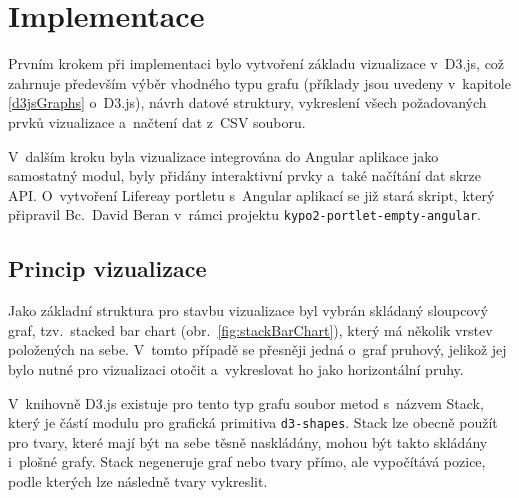 \documentclass[
  digital, %
  oneside, %
  table,   %
  nolof,     %
  nolot,     %
  nocover
]{fithesis3}
\begin{document}
\chapter{Implementace}
Prvním krokem při implementaci bylo vytvoření základu vizualizace v~D3.js, což zahrnuje především výběr vhodného typu grafu (příklady jsou uvedeny v~kapitole \ref{d3jsGraphs} o~D3.js), návrh datové struktury, vykreslení všech požadovaných prvků vizualizace a~načtení dat z~CSV souboru.\par
V~dalším kroku byla vizualizace integrována do Angular aplikace jako samostatný modul, byly přidány interaktivní prvky a~také načítání dat skrze API. O~vytvoření Lifereay portletu s~Angular aplikací se již stará skript, který připravil Bc.~David Beran v~rámci projektu \verb|kypo2-portlet-empty-angular|.
\section{Princip vizualizace}
Jako základní struktura pro stavbu vizualizace byl vybrán skládaný sloupcový graf, tzv.~stacked bar chart (obr.~\ref{fig:stackBarChart}), který má několik vrstev položených na sebe. V~tomto případě se přesněji jedná o~graf pruhový, jelikož jej bylo nutné pro vizualizaci otočit a~vykreslovat ho jako horizontální pruhy.\par
V~knihovně D3.js existuje pro tento typ grafu soubor metod s~názvem Stack, který je částí modulu pro grafická primitiva \verb|d3-shapes|. Stack lze obecně použít pro tvary, které mají být na sebe těsně naskládány, mohou být takto skládány i~plošné grafy. Stack negeneruje graf nebo tvary přímo, ale vypočítává pozice, podle kterých lze následně tvary vykreslit. \cite{d3jsorg}\par
\end{document}
